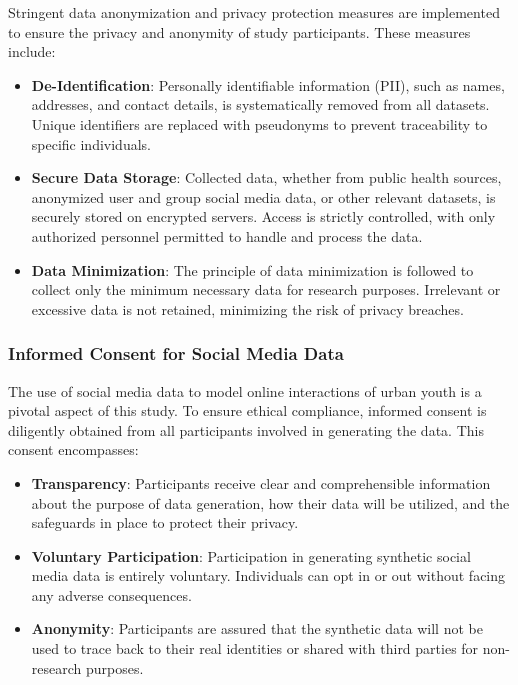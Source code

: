 \documentclass[11pt]{article}
\begin{document}
Stringent data anonymization and privacy protection measures are implemented to ensure the privacy and anonymity of study participants. These measures include:

\begin{itemize}
    \item \textbf{De-Identification}: Personally identifiable information (PII), such as names, addresses, and contact details, is systematically removed from all datasets. Unique identifiers are replaced with pseudonyms to prevent traceability to specific individuals.
    
    \item \textbf{Secure Data Storage}: Collected data, whether from public health sources, anonymized user and group social media data, or other relevant datasets, is securely stored on encrypted servers. Access is strictly controlled, with only authorized personnel permitted to handle and process the data.
    
    \item \textbf{Data Minimization}: The principle of data minimization is followed to collect only the minimum necessary data for research purposes. Irrelevant or excessive data is not retained, minimizing the risk of privacy breaches.
\end{itemize}

\subsubsection{Informed Consent for Social Media Data}

The use of social media data to model online interactions of urban youth is a pivotal aspect of this study. To ensure ethical compliance, informed consent is diligently obtained from all participants involved in generating the data. This consent encompasses:

\begin{itemize}
    \item \textbf{Transparency}: Participants receive clear and comprehensible information about the purpose of data generation, how their data will be utilized, and the safeguards in place to protect their privacy.
    
    \item \textbf{Voluntary Participation}: Participation in generating synthetic social media data is entirely voluntary. Individuals can opt in or out without facing any adverse consequences.
    
    \item \textbf{Anonymity}: Participants are assured that the synthetic data will not be used to trace back to their real identities or shared with third parties for non-research purposes.
\end{itemize}
\end{document}

